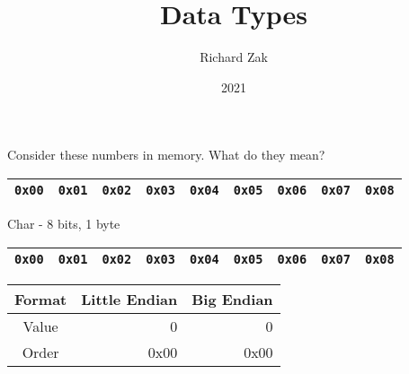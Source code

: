 \documentclass{beamer}
\title{Data Types}
\author{Richard Zak}
\institute{UMBC}
\date{2021}
\begin{document}

\begin{frame}
Consider these numbers in memory. What do they mean?
\begin{table}[]
\begin{tabular}{|l|l|l|l|l|l|l|l|l|}
\hline
 \texttt{0x00} & \texttt{0x01} & \texttt{0x02} & \texttt{0x03} & \texttt{0x04} & \texttt{0x05} & \texttt{0x06} & \texttt{0x07} &
 \texttt{0x08} \\
\hline 
\end{tabular}
\end{table}
\end{frame}

\begin{frame}{Char - 8 bits, 1 byte}

\begin{table}[]
\begin{tabular}{|l|l|l|l|l|l|l|l|l|}
\hline
 \color{red}\texttt{0x00} & \texttt{0x01} & \texttt{0x02} & \texttt{0x03} & \texttt{0x04} & \texttt{0x05} & \texttt{0x06} & \texttt{0x07} &
 \texttt{0x08} \\
\hline 
\end{tabular}
\end{table}

\begin{table}[]
\begin{tabular}{c r r}
Format & Little Endian & Big Endian \\
\hline
Value &  0   & 0 \\
Order & 0x00 & 0x00
\end{tabular}
\end{table}

\end{frame}
\end{document}
